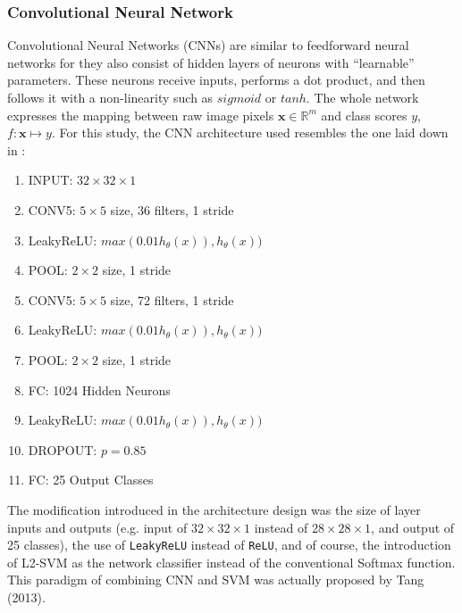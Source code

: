 \documentclass[sigconf]{acmart}
\renewcommand{\vec}[1]{\mathbf{#1}}
\begin{document}
\subsubsection{Convolutional Neural Network}\label{cnn}
Convolutional Neural Networks (CNNs) are similar to feedforward neural networks for they also consist of hidden layers of neurons with ``learnable'' parameters. These neurons receive inputs, performs a dot product, and then follows it with a non-linearity such as $sigmoid$ or $tanh$. The whole network expresses the mapping between raw image pixels $\vec{x} \in \mathbb{R}^{m}$ and class scores $y$, $f: \vec{x} \mapsto y$. For this study, the CNN architecture used resembles the one laid down in \cite{tensorflow_2017}:

\begin{enumerate}
\item INPUT: $32 \times 32 \times 1$
\item {\color{green}CONV5: $5 \times 5$ size, 36 filters, 1 stride}
\item {\color{red}LeakyReLU: $max(0.01h_{\theta}(x)), h_{\theta}(x))$}
\item {\color{blue}POOL: $2 \times 2$ size, 1 stride}
\item {\color{green}CONV5: $5 \times 5$ size, 72 filters, 1 stride}
\item {\color{red}LeakyReLU: $max(0.01h_{\theta}(x)), h_{\theta}(x))$}
\item {\color{blue}POOL: $2 \times 2$ size, 1 stride}
\item {\color{orange}FC: 1024 Hidden Neurons}
\item {\color{red}LeakyReLU: $max(0.01h_{\theta}(x)), h_{\theta}(x))$}
\item {\color{purple}DROPOUT: $p = 0.85$}
\item {\color{orange}FC: 25 Output Classes}
\end{enumerate}

The modification introduced in the architecture design was the size of layer inputs and outputs (e.g. input of $32 \times 32 \times 1$ instead of $28 \times 28 \times 1$, and output of 25 classes), the use of \texttt{LeakyReLU} instead of \texttt{ReLU}, and of course, the introduction of L2-SVM as the network classifier instead of the conventional Softmax function. This paradigm of combining CNN and SVM was actually proposed by Tang (2013)\cite{tang2013deep}.
\end{document}
